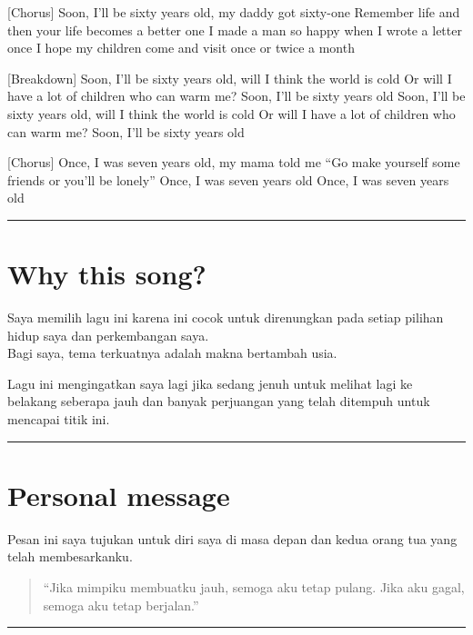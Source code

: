 \documentclass[
  letterpaper,
  DIV=11,
  numbers=noendperiod]{scrreprt}
\begin{document}
{[}Chorus{]} Soon, I'll be sixty years old, my daddy got sixty-one
Remember life and then your life becomes a better one I made a man so
happy when I wrote a letter once I hope my children come and visit once
or twice a month

{[}Breakdown{]} Soon, I'll be sixty years old, will I think the world is
cold Or will I have a lot of children who can warm me? Soon, I'll be
sixty years old Soon, I'll be sixty years old, will I think the world is
cold Or will I have a lot of children who can warm me? Soon, I'll be
sixty years old

{[}Chorus{]} Once, I was seven years old, my mama told me ``Go make
yourself some friends or you'll be lonely'' Once, I was seven years old
Once, I was seven years old

\begin{center}\rule{0.5\linewidth}{0.5pt}\end{center}

\section{Why this song?}\label{why-this-song}

Saya memilih lagu ini karena ini cocok untuk direnungkan pada setiap
pilihan hidup saya dan perkembangan saya.\\
Bagi saya, tema terkuatnya adalah makna bertambah usia.

Lagu ini mengingatkan saya lagi jika sedang jenuh untuk melihat lagi ke
belakang seberapa jauh dan banyak perjuangan yang telah ditempuh untuk
mencapai titik ini.

\begin{center}\rule{0.5\linewidth}{0.5pt}\end{center}

\section{Personal message}\label{personal-message}

Pesan ini saya tujukan untuk diri saya di masa depan dan kedua orang tua
yang telah membesarkanku.

\begin{quote}
``Jika mimpiku membuatku jauh, semoga aku tetap pulang. Jika aku gagal,
semoga aku tetap berjalan.''
\end{quote}

\begin{center}\rule{0.5\linewidth}{0.5pt}\end{center}
\end{document}
